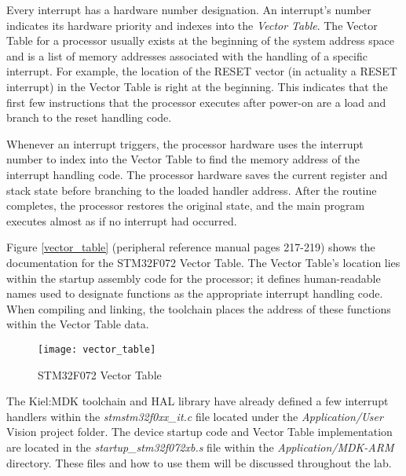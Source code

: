 \documentclass[11pt,fleqn]{book} %
\begin{document}
Every interrupt has a hardware number designation. An interrupt's number indicates its hardware priority and indexes into the \textit{Vector Table}. The Vector Table for a processor usually exists at the beginning of the system address space and is a list of memory addresses associated with the handling of a specific interrupt. For example, the location of the RESET vector (in actuality a RESET interrupt) in the Vector Table is right at the beginning. This indicates that the first few instructions that the processor executes after power-on are a load and branch to the reset handling code. 

Whenever an interrupt triggers, the processor hardware uses the interrupt number to index into the Vector Table to find the memory address of the interrupt handling code. The processor hardware saves the current register and stack state before branching to the loaded handler address. After the routine completes, the processor restores the original state, and the main program executes almost as if no interrupt had occurred. 

Figure \vref{vector_table} (peripheral reference manual pages 217-219) shows the documentation for the STM32F072 Vector Table. The Vector Table's location lies within the startup assembly code for the processor; it defines human-readable names used to designate functions as the appropriate interrupt handling code. When compiling and linking, the toolchain places the address of these functions within the Vector Table data.  

\begin{figure}[]
    \centering\texttt{[image: vector\_table]}
    \caption{STM32F072 Vector Table}
    \label{vector_table}
\end{figure}


The Kiel:MDK toolchain and HAL library have already defined a few interrupt handlers within the \textit{stmstm32f0xx\_it.c} file located under the \textit{Application/User} {\textmu}Vision project folder. The device startup code and Vector Table implementation are located in the \textit{startup\_stm32f072xb.s} file within the \textit{Application/MDK-ARM} directory. These files and how to use them will be discussed throughout the lab.

\end{document}

